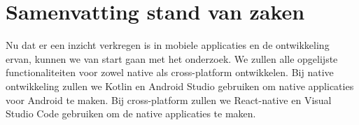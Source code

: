 \section{Samenvatting stand van zaken}
Nu dat er een inzicht verkregen is in mobiele applicaties en de ontwikkeling ervan, 
kunnen we van start gaan met het onderzoek. We zullen alle opgelijste functionaliteiten 
voor zowel native als cross-platform ontwikkelen. Bij native ontwikkeling zullen we 
Kotlin en Android Studio gebruiken om native applicaties voor Android te maken. 
Bij cross-platform zullen we React-native en Visual Studio Code gebruiken om de 
native applicaties te maken.














